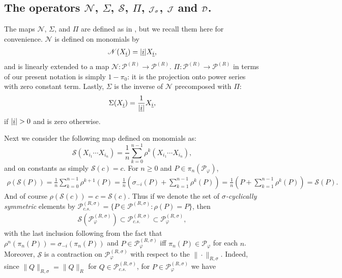 

\subsection{The operators $\mathscr{N}$, $\Sigma$, $\mathscr{S}$, $\Pi$, $\operatorname{\mathcal J}_\sigma$, $\operatorname{\mathcal J}$ and $\mathcal D$.}\label{tensor_product_notation}

The maps $\mathscr{N}$, $\Sigma$, and $\Pi$ are defined as in \cite{GS14},  but we recall them here for convenience. $\mathscr{N}$ is defined on monomials by
	\begin{align*}
		\mathscr{N}(X_{\underline{i}})=|\underline{i}|X_{\underline{i}},
	\end{align*}
and is linearly extended to a map $\mathscr{N}\colon \mathscr{P}^{(R)}\rightarrow\mathscr{P}^{(R)}$. $\Pi\colon \mathscr{P}^{(R)}\rightarrow \mathscr{P}^{(R)}$ in terms of our present notation is simply $1-\pi_0$: it is the projection onto power series with zero constant term. Lastly, $\Sigma$ is the inverse of $\mathscr{N}$ precomposed with $\Pi$:
	\begin{equation*}
		\Sigma (X_{\underline{i}})= \frac{1}{|\underline{i}|} X_{\underline{i}},
	\end{equation*}
if $|\underline{i}| >0$ and is zero otherwise.\par
Next we consider the following map defined on monomials as:
	\begin{equation*}
		\mathscr{S}(X_{i_1}\cdots X_{i_n})=\frac{1}{n}\sum_{k=0}^{n-1} \rho^k(X_{i_1}\cdots X_{i_n}),
	\end{equation*}
and on constants as simply $\mathscr{S}(c)=c$. For $n\geq 0$ and $P\in \pi_n\left(\mathscr{P}_\varphi\right)$,
	\begin{align*}
		\rho(\mathscr{S}(P))=\frac{1}{n}\sum_{k=0}^{n-1}\rho^{k+1}(P) = \frac{1}{n}\left( \sigma_{-i}(P)+\sum_{k=1}^{n-1} \rho^k(P)\right)= \frac{1}{n}\left( P+\sum_{k=1}^{n-1}\rho^k(P)\right)=\mathscr{S}(P).
	\end{align*}
And of course $\rho(\mathscr{S}(c))=c=\mathscr{S}(c)$. Thus if we denote the set of \textit{$\sigma$-cyclically symmetric} elements by $\mathscr{P}^{(R,\sigma)}_{c.s.}=\{P\in\mathscr{P}^{(R,\sigma)}\colon \rho(P)=P\}$, then 
	\begin{align*}
		\mathscr{S}\left(\mathscr{P}^{(R,\sigma)}_\varphi\right)\subset \mathscr{P}^{(R,\sigma)}_{c.s.}\subset\mathscr{P}^{(R,\sigma)}_{\varphi},
	\end{align*}
with the last inclusion following from the fact that $\rho^n(\pi_n(P))=\sigma_{-i}(\pi_n(P))$ and $P\in\mathscr{P}^{(R,\sigma)}_\varphi$ iff $\pi_n(P)\in \mathscr{P}_\varphi$ for each $n$. Moreover, $\mathscr{S}$ is a contraction on $\mathscr{P}^{(R,\sigma)}_{\varphi}$ with respect to the $\|\cdot\|_{R,\sigma}$. Indeed, since $\|Q\|_{R,\sigma}=\|Q\|_R$ for $Q\in\mathscr{P}^{(R,\sigma)}_{c.s.}$, for $P\in\mathscr{P}^{(R,\sigma)}_{\varphi}$ we have
